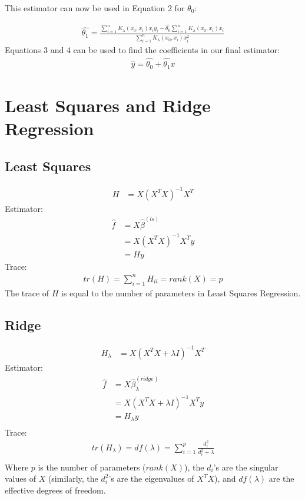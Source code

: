 \documentclass[a4paper]{article}
\begin{document}
This estimator can now be used in Equation 2 for $\theta_0$:

\begin{align}
  \hat{\theta_1} = \frac{\sum\limits_{i=1}^n K_\lambda(x_0,x_i) x_i y_i -
                   \hat{\theta_0}\sum\limits_{i=1}^n K_\lambda(x_0,x_i) x_i}
                  {\sum\limits_{i=1}^n K_\lambda(x_0,x_i) x_i^2}
\end{align}
Equations 3 and 4 can be used to find the coefficients in our final estimator:
\begin{align*}
  \hat{y} = \hat{\theta_0} + \hat{\theta_1}x
\end{align*}

\section{Least Squares and Ridge Regression}
\subsection{Least Squares}
\begin{align*}
  H &= X(X^TX)^{-1}X^T
\end{align*}
Estimator:
\begin{align*}
  \hat{f} &= X\hat{\beta}^{(ls)}\\
          &= X(X^TX)^{-1}X^Ty\\
          &= Hy
\end{align*}
Trace:
\begin{align*}
  tr(H) = \sum\limits_{i=1}^{n} H_{ii}  = rank(X) = p
\end{align*}
The trace of $H$ is equal to the number of parameters in Least Squares Regression.
\subsection{Ridge}

\begin{align*}
  H_\lambda &= X(X^TX + \lambda I)^{-1}X^T
\end{align*}
Estimator:
\begin{align*}
  \hat{f} &= X\hat{\beta}^{(ridge)}_\lambda\\ 
          &= X(X^TX + \lambda I)^{-1}X^Ty\\
          &= H_\lambda y\\
\end{align*}
Trace:
\begin{align*}
  tr(H_\lambda) = df(\lambda) = \sum\limits_{i=1}^p \frac{d_i^2}
                                                         {d_i^2 + \lambda}\\
\end{align*}
Where $p$ is the number of parameters ($rank(X)$), the $d_i$'s are the
singular values of $X$ (similarly, the $d_i^2$'s are the eigenvalues of $X^TX$), and
$df(\lambda)$ are the effective degrees of freedom.\\
\end{document}
